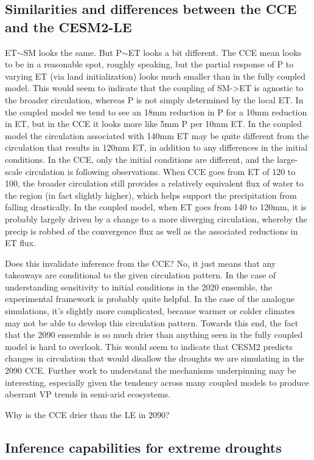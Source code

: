 \documentclass[draft]{agujournal2019}
\begin{document}
\subsection{Similarities and differences between the CCE and the CESM2-LE}
ET$\sim$SM looks the same. But P$\sim$ET looks a bit different. The CCE mean looks to be in a reasonable spot, roughly speaking, but the partial response of P to varying ET (via land initialization) looks much smaller than in the fully coupled model. This would seem to indicate that the coupling of SM->ET is agnostic to the broader circulation, whereas P is not simply determined by the local ET. In the coupled model we tend to see an 18mm reduction in P for a 10mm reduction in ET, but in the CCE it looks more like 5mm P per 10mm ET. In the coupled model the circulation associated with 140mm ET may be quite different from the circulation that results in 120mm ET, in addition to any differences in the initial conditions. In the CCE, only the initial conditions are different, and the large-scale circulation is following observations. When CCE goes from ET of 120 to 100, the broader circulation still provides a relatively equivalent flux of water to the region (in fact slightly higher), which helps support the precipitation from falling drastically. In the coupled model, when ET goes from 140 to 120mm, it is probably largely driven by a change to a more diverging circulation, whereby the precip is robbed of the convergence flux as well as the associated reductions in ET flux. 

Does this invalidate inference from the CCE? No, it just means that any takeaways are conditional to the given circulation pattern. In the case of understanding sensitivity to initial conditions in the 2020 ensemble, the experimental framework is probably quite helpful. In the case of the analogue simulations, it's slightly more complicated, because warmer or colder climates may not be able to develop this circulation pattern. Towards this end, the fact that the 2090 ensemble is so much drier than anything seen in the fully coupled model is hard to overlook. This would seem to indicate that CESM2 predicts changes in circulation that would disallow the droughts we are simulating in the 2090 CCE. Further work to understand the mechanisms underpinning may be interesting, especially given the tendency across many coupled models to produce aberrant VP trends in semi-arid ecosystems. 


Why is the CCE drier than the LE in 2090?


\subsection{Inference capabilities for extreme droughts}
\end{document}
